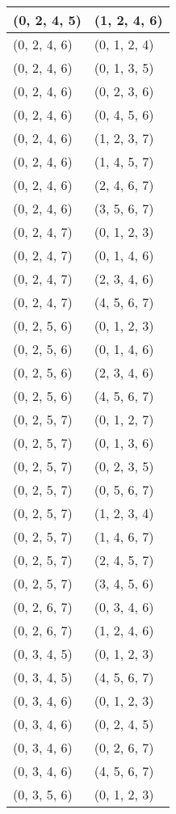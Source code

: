 \begin{footnotesize}
\begin{longtable}[c]{|l|l|}
(0, 2, 4, 5)
&(1, 2, 4, 6)
\\ \hline
(0, 2, 4, 6)
&(0, 1, 2, 4)
\\ \hline
(0, 2, 4, 6)
&(0, 1, 3, 5)
\\ \hline
(0, 2, 4, 6)
&(0, 2, 3, 6)
\\ \hline
(0, 2, 4, 6)
&(0, 4, 5, 6)
\\ \hline
(0, 2, 4, 6)
&(1, 2, 3, 7)
\\ \hline
(0, 2, 4, 6)
&(1, 4, 5, 7)
\\ \hline
(0, 2, 4, 6)
&(2, 4, 6, 7)
\\ \hline
(0, 2, 4, 6)
&(3, 5, 6, 7)
\\ \hline
(0, 2, 4, 7)
&(0, 1, 2, 3)
\\ \hline
(0, 2, 4, 7)
&(0, 1, 4, 6)
\\ \hline
(0, 2, 4, 7)
&(2, 3, 4, 6)
\\ \hline
(0, 2, 4, 7)
&(4, 5, 6, 7)
\\ \hline
(0, 2, 5, 6)
&(0, 1, 2, 3)
\\ \hline
(0, 2, 5, 6)
&(0, 1, 4, 6)
\\ \hline
(0, 2, 5, 6)
&(2, 3, 4, 6)
\\ \hline
(0, 2, 5, 6)
&(4, 5, 6, 7)
\\ \hline
(0, 2, 5, 7)
&(0, 1, 2, 7)
\\ \hline
(0, 2, 5, 7)
&(0, 1, 3, 6)
\\ \hline
(0, 2, 5, 7)
&(0, 2, 3, 5)
\\ \hline
(0, 2, 5, 7)
&(0, 5, 6, 7)
\\ \hline
(0, 2, 5, 7)
&(1, 2, 3, 4)
\\ \hline
(0, 2, 5, 7)
&(1, 4, 6, 7)
\\ \hline
(0, 2, 5, 7)
&(2, 4, 5, 7)
\\ \hline
(0, 2, 5, 7)
&(3, 4, 5, 6)
\\ \hline
(0, 2, 6, 7)
&(0, 3, 4, 6)
\\ \hline
(0, 2, 6, 7)
&(1, 2, 4, 6)
\\ \hline
(0, 3, 4, 5)
&(0, 1, 2, 3)
\\ \hline
(0, 3, 4, 5)
&(4, 5, 6, 7)
\\ \hline
(0, 3, 4, 6)
&(0, 1, 2, 3)
\\ \hline
(0, 3, 4, 6)
&(0, 2, 4, 5)
\\ \hline
(0, 3, 4, 6)
&(0, 2, 6, 7)
\\ \hline
(0, 3, 4, 6)
&(4, 5, 6, 7)
\\ \hline
(0, 3, 5, 6)
&(0, 1, 2, 3)
\\ \hline

\end{longtable}
\end{footnotesize}
